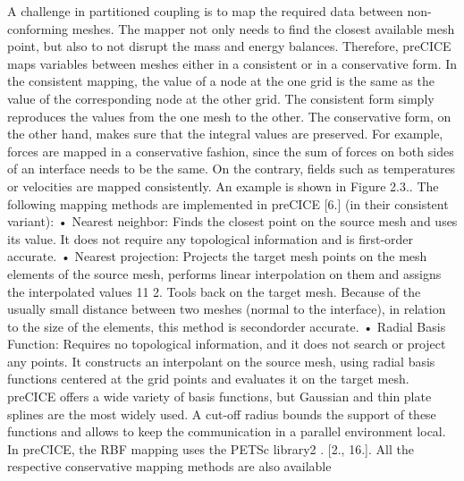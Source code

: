 A challenge in partitioned coupling is to map the required data between non-conforming
meshes. The mapper not only needs to find the closest available mesh point, but also to not
disrupt the mass and energy balances. Therefore, preCICE maps variables between meshes
either in a consistent or in a conservative form. In the consistent mapping, the value of a
node at the one grid is the same as the value of the corresponding node at the other grid.
The consistent form simply reproduces the values from the one mesh to the other. The
conservative form, on the other hand, makes sure that the integral values are preserved.
For example, forces are mapped in a conservative fashion, since the sum of forces on both
sides of an interface needs to be the same. On the contrary, fields such as temperatures or
velocities are mapped consistently. An example is shown in Figure 2.3..
The following mapping methods are implemented in preCICE [6.] (in their consistent
variant):
• Nearest neighbor: Finds the closest point on the source mesh and uses its value.
It does not require any topological information and is first-order accurate.
• Nearest projection: Projects the target mesh points on the mesh elements of the
source mesh, performs linear interpolation on them and assigns the interpolated values
11
2. Tools
back on the target mesh. Because of the usually small distance between two meshes
(normal to the interface), in relation to the size of the elements, this method is secondorder
accurate.
• Radial Basis Function: Requires no topological information, and it does not search
or project any points. It constructs an interpolant on the source mesh, using radial basis
functions centered at the grid points and evaluates it on the target mesh. preCICE
offers a wide variety of basis functions, but Gaussian and thin plate splines are the
most widely used. A cut-off radius bounds the support of these functions and allows
to keep the communication in a parallel environment local. In preCICE, the RBF
mapping uses the PETSc library2
. [2., 16.].
All the respective conservative mapping methods are also available


